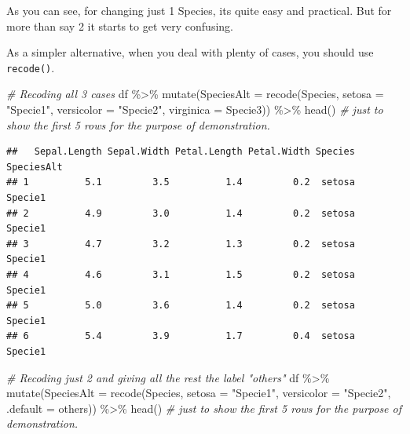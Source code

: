 \documentclass[
]{book}
\newenvironment{Shaded}{\begin{snugshade}}{\end{snugshade}}
\newcommand{\AttributeTok}[1]{\textcolor[rgb]{0.77,0.63,0.00}{#1}}
\newcommand{\CommentTok}[1]{\textcolor[rgb]{0.56,0.35,0.01}{\textit{#1}}}
\newcommand{\FunctionTok}[1]{\textcolor[rgb]{0.00,0.00,0.00}{#1}}
\newcommand{\NormalTok}[1]{#1}
\newcommand{\SpecialCharTok}[1]{\textcolor[rgb]{0.00,0.00,0.00}{#1}}
\newcommand{\StringTok}[1]{\textcolor[rgb]{0.31,0.60,0.02}{#1}}
\begin{document}
As you can see, for changing just 1 Species, its quite easy and practical.
But for more than say 2 it starts to get very confusing.

As a simpler alternative, when you deal with plenty of cases, you should use \texttt{recode()}.

\begin{Shaded}
\begin{Highlighting}[]
\CommentTok{\# Recoding all 3 cases}
\NormalTok{df }\SpecialCharTok{\%\textgreater{}\%} 
  \FunctionTok{mutate}\NormalTok{(}\AttributeTok{SpeciesAlt =} \FunctionTok{recode}\NormalTok{(Species, }\AttributeTok{setosa =} \StringTok{"Specie1"}\NormalTok{,}
                             \AttributeTok{versicolor =} \StringTok{"Specie2"}\NormalTok{, }
                             \AttributeTok{virginica =} \StringTok{\textquotesingle{}Specie3\textquotesingle{}}\NormalTok{)) }\SpecialCharTok{\%\textgreater{}\%} 
  \FunctionTok{head}\NormalTok{()  }\CommentTok{\# just to show the first 5 rows for the purpose of demonstration.}
\end{Highlighting}
\end{Shaded}

\begin{verbatim}
##   Sepal.Length Sepal.Width Petal.Length Petal.Width Species SpeciesAlt
## 1          5.1         3.5          1.4         0.2  setosa    Specie1
## 2          4.9         3.0          1.4         0.2  setosa    Specie1
## 3          4.7         3.2          1.3         0.2  setosa    Specie1
## 4          4.6         3.1          1.5         0.2  setosa    Specie1
## 5          5.0         3.6          1.4         0.2  setosa    Specie1
## 6          5.4         3.9          1.7         0.4  setosa    Specie1
\end{verbatim}

\begin{Shaded}
\begin{Highlighting}[]
\CommentTok{\# Recoding just 2 and giving all the rest the label "others"}
\NormalTok{df }\SpecialCharTok{\%\textgreater{}\%} 
  \FunctionTok{mutate}\NormalTok{(}\AttributeTok{SpeciesAlt =} \FunctionTok{recode}\NormalTok{(Species, }\AttributeTok{setosa =} \StringTok{"Specie1"}\NormalTok{,}
                             \AttributeTok{versicolor =} \StringTok{"Specie2"}\NormalTok{, }\AttributeTok{.default =} \StringTok{\textquotesingle{}others\textquotesingle{}}\NormalTok{)) }\SpecialCharTok{\%\textgreater{}\%} 
  \FunctionTok{head}\NormalTok{()  }\CommentTok{\# just to show the first 5 rows for the purpose of demonstration.}
\end{Highlighting}
\end{Shaded}
\end{document}
